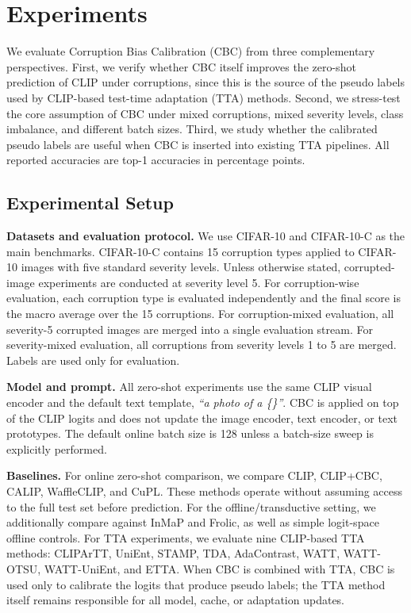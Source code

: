 \section{Experiments}
\label{sec:experiments}

We evaluate Corruption Bias Calibration (CBC) from three complementary perspectives.
First, we verify whether CBC itself improves the zero-shot prediction of CLIP under corruptions, since this is the source of the pseudo labels used by CLIP-based test-time adaptation (TTA) methods.
Second, we stress-test the core assumption of CBC under mixed corruptions, mixed severity levels, class imbalance, and different batch sizes.
Third, we study whether the calibrated pseudo labels are useful when CBC is inserted into existing TTA pipelines.
All reported accuracies are top-1 accuracies in percentage points.

\subsection{Experimental Setup}
\label{subsec:experimental_setup}

\noindent\textbf{Datasets and evaluation protocol.}
We use CIFAR-10 and CIFAR-10-C as the main benchmarks.
CIFAR-10-C contains 15 corruption types applied to CIFAR-10 images with five standard severity levels.
Unless otherwise stated, corrupted-image experiments are conducted at severity level 5.
For corruption-wise evaluation, each corruption type is evaluated independently and the final score is the macro average over the 15 corruptions.
For corruption-mixed evaluation, all severity-5 corrupted images are merged into a single evaluation stream.
For severity-mixed evaluation, all corruptions from severity levels 1 to 5 are merged.
Labels are used only for evaluation.

\noindent\textbf{Model and prompt.}
All zero-shot experiments use the same CLIP visual encoder and the default text template,
\emph{``a photo of a \{\}''}.
CBC is applied on top of the CLIP logits and does not update the image encoder, text encoder, or text prototypes.
The default online batch size is 128 unless a batch-size sweep is explicitly performed.

\noindent\textbf{Baselines.}
For online zero-shot comparison, we compare CLIP, CLIP+CBC, CALIP, WaffleCLIP, and CuPL.
These methods operate without assuming access to the full test set before prediction.
For the offline/transductive setting, we additionally compare against InMaP and Frolic, as well as simple logit-space offline controls.
For TTA experiments, we evaluate nine CLIP-based TTA methods: CLIPArTT, UniEnt, STAMP, TDA, AdaContrast, WATT, WATT-OTSU, WATT-UniEnt, and ETTA.
When CBC is combined with TTA, CBC is used only to calibrate the logits that produce pseudo labels; the TTA method itself remains responsible for all model, cache, or adaptation updates.

